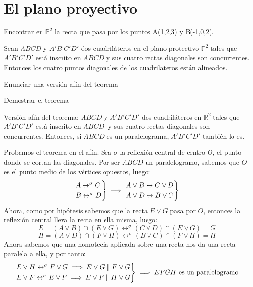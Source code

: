 
\section{El plano proyectivo}

\begin{ejer}
  Encontrar en $\mathbb{P}^2$ la recta que pasa por los puntos A(1,2,3) y B(-1,0,2).
\end{ejer}

\begin{ejer}
	Sean $ABCD$ y $A'B'C'D'$ dos cuadriláteros en el plano protectivo $\mathbb{P}^2$ tales que $A'B'C'D'$ está inscrito en $ABCD$ y sus cuatro rectas diagonales son concurrentes. Entonces  los cuatro puntos diagonales de los cuadrilateros están alineados.
	\begin{nlist}
		\item Enunciar una versión afín del teorema
		\item Demostrar el teorema
\end{nlist}
\end{ejer}

\begin{nlist}
	\item Versión afín del teorema: $ABCD$ y $A'B'C'D'$ dos cuadriláteros en $\mathbb{R}^2$ tales que $A'B'C'D'$ está inscrito en $ABCD$, y sus cuatro rectas diagonales son concurrentes. Entonces, si $ABCD$ es un paralelograma, $A'B'C'D'$ también lo es.
	\item Probamos el teorema en el afín. Sea $\sigma$ la reflexión central de centro $O$, el punto donde se cortan las diagonales. Por ser $ABCD$ un paralelogramo, sabemos que $O$ es el punto medio de los vértices opuestos, luego:
	\[
	\begin{rcases}
		A \leftrightarrow^\sigma C\\
		B \leftrightarrow^\sigma D
\end{rcases} \implies
	\begin{rcases}
		A\vee B \leftrightarrow C \vee D\\
		A \vee D \leftrightarrow B \vee C
\end{rcases}
\]
Ahora, como por hipótesis sabemos que la recta $E \vee G$ pasa por $O$, entonces la reflexión central lleva la recta en ella misma, luego:
$$E = (A \vee B) \cap (E \vee G) \leftrightarrow^\sigma (C \vee D) \cap (E \vee G) = G$$
$$H = (A \vee D) \cap (F \vee H) \leftrightarrow^\sigma (B \vee C) \cap (F \vee H) = H$$
Ahora sabemos que una homotecia aplicada sobre una recta nos da una recta paralela a ella, y por tanto:
\[
\begin{rcases}
	E\vee H \leftrightarrow^\sigma F \vee G \implies E \vee G \parallel F \vee G\\
	E\vee F \leftrightarrow^\sigma E \vee F \implies E \vee F \parallel H \vee G
\end{rcases} \implies EFGH \text{ es un paralelogramo}
\]
\end{nlist}





